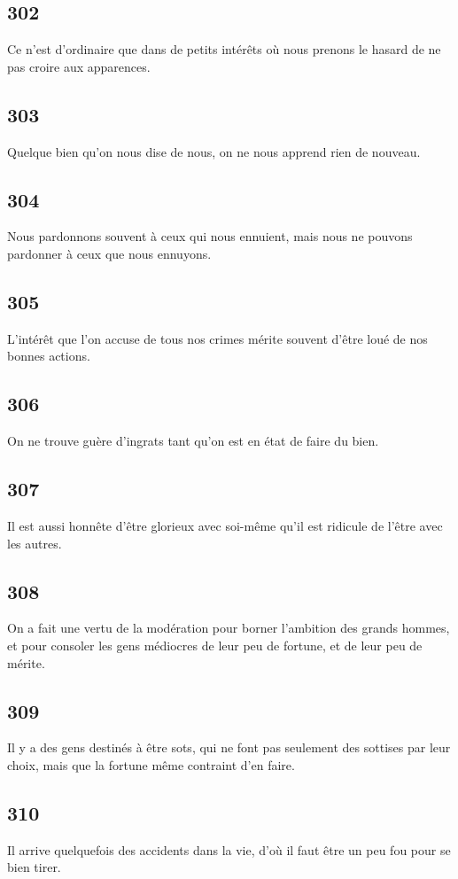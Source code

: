 \documentclass[french,twoside]{book} %
\begin{document}
\subsection[{302}]{ \textsc{302} }
\noindent Ce n’est d’ordinaire que dans de petits intérêts où nous prenons le hasard de ne pas croire aux apparences.
\subsection[{303}]{ \textsc{303} }
\noindent Quelque bien qu’on nous dise de nous, on ne nous apprend rien de nouveau.
\subsection[{304}]{ \textsc{304} }
\noindent Nous pardonnons souvent à ceux qui nous ennuient, mais nous ne pouvons pardonner à ceux que nous ennuyons.
\subsection[{305}]{ \textsc{305} }
\noindent L’intérêt que l’on accuse de tous nos crimes mérite souvent d’être loué de nos bonnes actions.
\subsection[{306}]{ \textsc{306} }
\noindent On ne trouve guère d’ingrats tant qu’on est en état de faire du bien.
\subsection[{307}]{ \textsc{307} }
\noindent Il est aussi honnête d’être glorieux avec soi-même qu’il est ridicule de l’être avec les autres.
\subsection[{308}]{ \textsc{308} }
\noindent On a fait une vertu de la modération pour borner l’ambition des grands hommes, et pour consoler les gens médiocres de leur peu de fortune, et de leur peu de mérite.
\subsection[{309}]{ \textsc{309} }
\noindent Il y a des gens destinés à être sots, qui ne font pas seulement des sottises par leur choix, mais que la fortune même contraint d’en faire.
\subsection[{310}]{ \textsc{310} }
\noindent Il arrive quelquefois des accidents dans la vie, d’où il faut être un peu fou pour se bien tirer.
\end{document}
